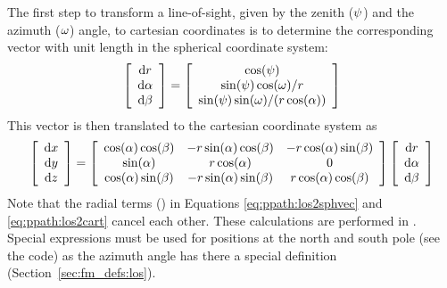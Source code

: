 The first step to transform a line-of-sight, given by the zenith
($\psi$) and the azimuth ($\omega$) angle, to cartesian
coordinates is to determine the corresponding vector with unit length
in the spherical coordinate system:
\begin{equation}
 \left[ \begin{array}{c}
  \mathrm{d} r \\
  \mathrm{d} \alpha \\
  \mathrm{d} \beta
 \end{array} \right] =
 \left[ \begin{array}{c}
   \cos(\psi) \\
   \sin(\psi) \cos(\omega) / r \\
   \sin(\psi) \sin(\omega) / ( r \cos(\alpha) )
 \end{array} \right]
 \label{eq:ppath:los2sphvec}
\end{equation}
This vector is then translated to the cartesian coordinate system as
\begin{equation}
 \left[ \begin{array}{c}
  \mathrm{d} x \\
  \mathrm{d} y \\
  \mathrm{d} z
 \end{array} \right] =
 \left[ \begin{array}{ccc}
  \cos(\alpha)\cos(\beta) & -r\sin(\alpha)\cos(\beta) & 
                                                   -r\cos(\alpha)\sin(\beta) \\
  \sin(\alpha)           & r\cos(\alpha)            & 0                     \\ 
  \cos(\alpha)\sin(\beta) & -r\sin(\alpha)\sin(\beta) & r\cos(\alpha)\cos(\beta) 
 \end{array} \right] 
 \left[ \begin{array}{c}
  \mathrm{d} r \\
  \mathrm{d} \alpha \\
  \mathrm{d} \beta
 \end{array} \right]
 \label{eq:ppath:los2cart}
\end{equation}
Note that the radial terms (\Rds) in Equations
\ref{eq:ppath:los2sphvec} and \ref{eq:ppath:los2cart} cancel each
other.  These calculations are performed in .
Special expressions must be used for positions at the north and south
pole (see the code) as the azimuth angle has there a special
definition (Section~\ref{sec:fm_defs:los}).

